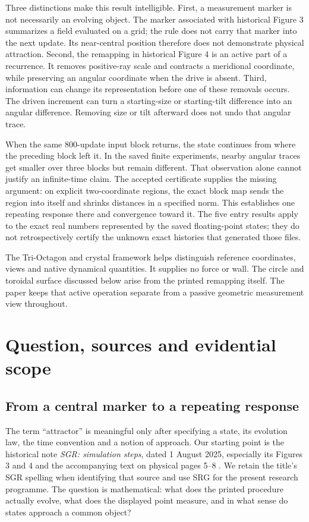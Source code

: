 \documentclass[11pt,a4paper]{article}
\numberwithin{equation}{section}
\begin{document}
Three distinctions make this result intelligible. First, a measurement marker is not necessarily an evolving object. The marker associated with historical Figure 3 summarizes a field evaluated on a grid; the rule does not carry that marker into the next update. Its near-central position therefore does not demonstrate physical attraction. Second, the remapping in historical Figure 4 is an active part of a recurrence. It removes positive-ray scale and contracts a meridional coordinate, while preserving an angular coordinate when the drive is absent. Third, information can change its representation before one of these removals occurs. The driven increment can turn a starting-size or starting-tilt difference into an angular difference. Removing size or tilt afterward does not undo that angular trace.

When the same 800-update input block returns, the state continues from where the preceding block left it. In the saved finite experiments, nearby angular traces get smaller over three blocks but remain different. That observation alone cannot justify an infinite-time claim. The accepted certificate supplies the missing argument: on explicit two-coordinate regions, the exact block map sends the region into itself and shrinks distances in a specified norm. This establishes one repeating response there and convergence toward it. The five entry results apply to the exact real numbers represented by the saved floating-point states; they do not retrospectively certify the unknown exact histories that generated those files.

The Tri-Octagon and crystal framework helps distinguish reference coordinates, views and native dynamical quantities. It supplies no force or wall. The circle and toroidal surface discussed below arise from the printed remapping itself. The paper keeps that active operation separate from a passive geometric measurement view throughout.
\tableofcontents
\clearpage

\section{Question, sources and evidential scope}\label{sec:scope}
\subsection{From a central marker to a repeating response}
The term ``attractor'' is meaningful only after specifying a state, its evolution law, the time convention and a notion of approach. Our starting point is the historical note \emph{SGR: simulation steps}, dated 1 August 2025, especially its Figures 3 and 4 and the accompanying text on physical pages 5--8 \cite{historical}. We retain the title's SGR spelling when identifying that source and use SRG for the present research programme. The question is mathematical: what does the printed procedure actually evolve, what does the displayed point measure, and in what sense do states approach a common object?
\end{document}
